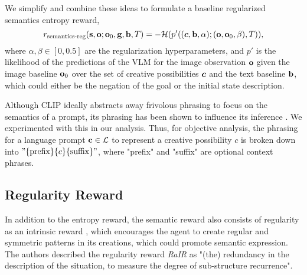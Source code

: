 We simplify and combine these ideas to formulate a baseline regularized semantics entropy reward,
\begin{equation}
    \label{eq:entropy-reward-reg}
    r_{\text{semantics-reg}}(\mathbf{s}, \mathbf{o}; \mathbf{o}_0, \mathbf{g}, \mathbf{b}, T) = -\mathcal{H}(p'((\bm{c}, \mathbf{b}, \alpha); (\mathbf{o}, \mathbf{o}_0, \beta), T)),
\end{equation}
where \(\alpha, \beta \in [0, 0.5]\) are the regularization hyperparameters, and \(p'\) is the likelihood of the predictions of the VLM for the image observation \(\mathbf{o}\) given the image baseline \(\mathbf{o}_0\) over the set of creative possibilities \(\bm{c}\) and the text baseline \(\mathbf{b}\), which could either be the negation of the goal or the initial state description.

Although CLIP ideally abstracts away frivolous phrasing to focus on the semantics of a prompt, its phrasing has been shown to influence its inference \citep{waffleclip}. 
We experimented with this in our analysis.
Thus, for objective analysis, the phrasing for a language prompt \(\mathbf{c} \in \mathcal{L}\) to represent a creative possibility \(c\) is broken down into \("\{\text{prefix}\}\{c\}\{\text{suffix}\}"\), where "prefix" and "suffix" are optional context phrases.

\subsection{Regularity Reward}
\label{sec:regularity-reward}
In addition to the entropy reward, the semantic reward also consists of regularity as an intrinsic reward \citep{rair}, which encourages the agent to create regular and symmetric patterns in its creations, which could promote semantic expression.
The authors described the regularity reward \textit{RaIR} as "(the) redundancy in the description of the situation, to measure the degree of sub-structure recurrence".

